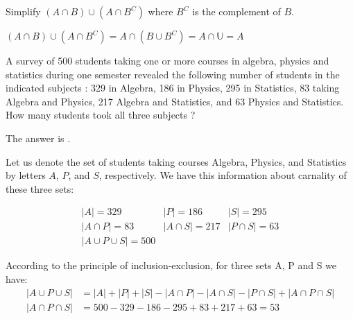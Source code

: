\documentclass{ximera}
\begin{document}
\begin{question}
Simplify $(A \cap B) \cup (A \cap B^C)$ where $B^C$ is the complement of $B$.
\begin{solution}
\begin{multiple-choice}
  \choice{$\emptyset$}
\end{multiple-choice}
\end{solution}
$(A \cap B) \cup (A \cap B^C) = A \cap (B \cup B^C) = A \cap \mathbb{U} = A$
\end{question}

\begin{question}
A survey of 500 students taking one or more courses in algebra,
physics and statistics during one semester revealed the following
number of students in the indicated subjects : 329 in Algebra, 186 in
Physics, 295 in Statistics, 83 taking Algebra and Physics, 217 Algebra
and Statistics, and 63 Physics and Statistics.  How many students took
all three subjects ?
\begin{solution}
The answer is . 
\end{solution}

Let us denote the set of students taking courses Algebra, Physics, and
Statistics by letters $A$, $P$, and $S$, respectively. We have this
information about carnality of these three sets:

\begin{equation*}
	\begin{array}{lll}
	 |A| = 329							& |P| = 186				& |S| = 295 \\
	 |A \cap P| = 83				& |A \cap S| = 217	& |P \cap S| = 63 \\
	 |A \cup P \cup S| = 500	& &
	\end{array}
\end{equation*}

According to the principle of inclusion-exclusion, for three sets A, P and S we have:
\begin{align*}
|A \cup P \cup S| &= |A| + |P| + |S| - |A \cap P| - |A \cap S| - |P \cap S| + |A \cap P \cap S|\\
|A \cap P \cap S| &= 500 - 329 - 186 - 295 + 83 + 217 + 63 = 53
\end{align*}
\end{question}
\end{document}
